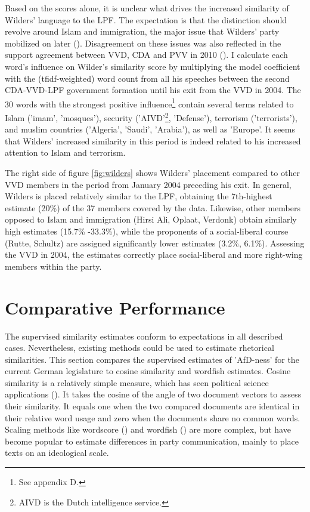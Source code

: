 \documentclass{article}
\begin{document}
Based on the scores alone, it is unclear what drives the increased similarity of Wilders' language to the LPF. The expectation is that the distinction should revolve around Islam and immigration, the major issue that Wilders' party mobilized on later (\cite{VanHolsteyn2011}). Disagreement on these issues was also reflected in the support agreement between VVD, CDA and PVV in 2010 (\cite[350]{Otjes2014}). I calculate each word's influence on Wilder's similarity score by multiplying the model coefficient with the (tfidf-weighted) word count from all his speeches between the second CDA-VVD-LPF government formation until his exit from the VVD in 2004. The 30 words with the strongest positive influence\footnote{See appendix D.} contain several terms related to Islam ('imam', 'mosques'), security ('AIVD'\footnote{AIVD is the Dutch intelligence service.}, 'Defense'), terrorism ('terrorists'), and muslim countries ('Algeria', 'Saudi', 'Arabia'), as well as 'Europe'. It seems that Wilders' increased similarity in this period is indeed related to his increased attention to Islam and terrorism.\par

The right side of figure \ref{fig:wilders} shows Wilders' placement compared to other VVD members in the period from January 2004 preceding his exit. In general, Wilders is placed relatively similar to the LPF, obtaining the 7th-highest estimate (20\%) of the 37 members covered by the data. Likewise, other members opposed to Islam and immigration (Hirsi Ali, Oplaat, Verdonk) obtain similarly high estimates (15.7\% -33.3\%), while the proponents of a social-liberal course (Rutte, Schultz) are assigned significantly lower estimates (3.2\%, 6.1\%). Assessing the VVD in 2004, the estimates correctly place social-liberal and more right-wing members within the party.\par 



\section{Comparative Performance}
The supervised similarity estimates conform to expectations in all described cases. Nevertheless, existing methods could be used to estimate rhetorical similarities. This section compares the supervised estimates of 'AfD-ness' for the current German legislature to cosine similarity and wordfish estimates. Cosine similarity is a relatively simple measure, which has seen political science applications (\cite{Similarity2007a, Hager2020}). It takes the cosine of the angle of two document vectors to assess their similarity. It equals one when the two compared documents are identical in their relative word usage and zero when the documents share no common words. Scaling methods like wordscore (\cite{Laver2003}) and wordfish (\cite{Slapin2008}) are more complex, but have become popular to estimate differences in party communication, mainly to place texts on an ideological scale. \par
\end{document}

